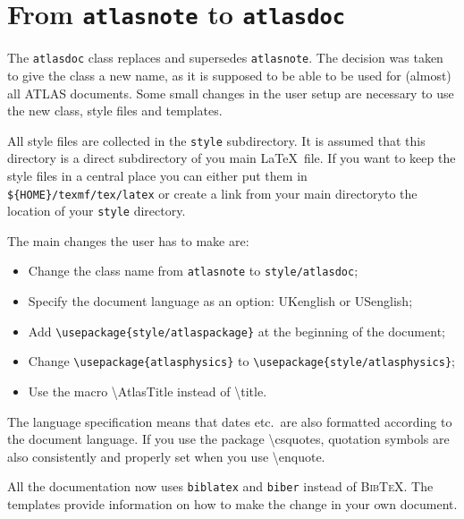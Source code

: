 \documentclass[UKenglish]{style/atlasdoc}
\newcommand{\BibTeX}{\textsc{Bib\TeX}}
\newcommand{\Macro}[1]{\textbackslash #1\xspace}
\begin{document}
\section{From \texttt{atlasnote} to \texttt{atlasdoc}}
\label{sec:oldnote}

The \texttt{atlasdoc} class replaces and supersedes \texttt{atlasnote}.
The decision was taken to give the class a new name, as it is supposed to be
able to be used for (almost) all ATLAS documents.
Some small changes in the user setup are necessary to use the new
class, style files and templates.

All style files are collected in the \texttt{style} subdirectory.
It is assumed that this directory is a direct subdirectory of you main \LaTeX\ file.
If you want to keep the style files in a central place you can either put them in
\verb|${HOME}/texmf/tex/latex| or create a link from your main directoryto the location of
your \texttt{style} directory.

The main changes the user has to make are:
\begin{itemize}
\item Change the class name from \texttt{atlasnote} to \texttt{style/atlasdoc};
\item Specify the document language as an option: UKenglish or USenglish;
\item Add \verb|\usepackage{style/atlaspackage}| at the beginning of the document;
\item Change \verb|\usepackage{atlasphysics}| to \verb|\usepackage{style/atlasphysics}|; 
\item Use the macro \Macro{AtlasTitle} instead of \Macro{title}.
\end{itemize}

The language specification means that dates etc.\ are also formatted according to 
the document language. 
If you use the package \Macro{csquotes}, quotation symbols are also consistently and properly set
when you use \Macro{enquote}.

All the documentation now uses \texttt{biblatex} and \texttt{biber} instead of \BibTeX.
The templates provide information on how to make the change in your own document.
\end{document}
